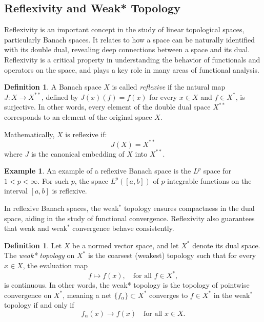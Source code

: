 \documentclass[12pt, reqno]{amsart}
\theoremstyle{definition}
\newtheorem{definition}[theorem]{Definition}
\newtheorem{example}[theorem]{Example}
\numberwithin{equation}{section}
\newcommand{\dR}{{\mathbb R}}
\begin{document}
\subsection{Reflexivity and Weak* Topology}
Reflexivity is an important concept in the study of linear topological spaces, particularly Banach spaces. It relates to how a space can be naturally identified with its double dual, revealing deep connections between a space and its dual. Reflexivity is a critical property in understanding the behavior of functionals and operators on the space, and plays a key role in many areas of functional analysis.

\begin{definition}
A Banach space $X$ is called \textit{reflexive} if the natural map $J: X \to X^{**}$, defined by $J(x)(f) = f(x)$ for every $x \in X$ and $f \in X^*$, is surjective. In other words, every element of the double dual space $X^{**}$ corresponds to an element of the original space $X$.

Mathematically, $X$ is reflexive if:
\[
J(X) = X^{**}
\]
where $J$ is the canonical embedding of $X$ into $X^{**}$.
\end{definition}

\begin{example}
An example of a reflexive Banach space is the $L^p$ space for $1 < p < \infty$. For such $p$, the space $L^p([a,b])$ of $p$-integrable functions on the interval $[a,b]$ is reflexive.
\end{example}

In reflexive Banach spaces, the weak\(^*\) topology ensures compactness in the dual space, aiding in the study of functional convergence. Reflexivity also guarantees that weak and weak\(^*\) convergence behave consistently.

\begin{definition}
Let $X$ be a normed vector space, and let $X^*$ denote its dual space. The \textit{weak*} \textit{topology} on $X^*$ is the coarsest (weakest) topology such that for every $x \in X$, the evaluation map
\[
f \mapsto f(x), \quad \text{for all } f \in X^*,
\]
is continuous. In other words, the weak* topology is the topology of pointwise convergence on $X^*$, meaning a net $\{ f_\alpha \} \subset X^*$ converges to $f \in X^*$ in the weak$^*$ topology if and only if
\[
f_\alpha(x) \to f(x) \quad \text{for all } x \in X.
\]
\end{definition}

\begin{comment}
\begin{example}
Consider the space $X = \dR^n$ with its usual norm. The dual space $X^*$ is also isomorphic to $\dR^n$. 

The weak* topology on $X^*$ in this case is the same as the standard Euclidean topology. Specifically, for any sequence $\{ f_k \} \subset \dR^n$, the sequence converges to some $f \in \dR^n$ in the weak* topology if and only if $f_k(x) \to f(x)$ for every $x \in \dR^n$, which in this case corresponds to ordinary component-wise convergence.
\end{example}
\end{comment}
\end{document}
